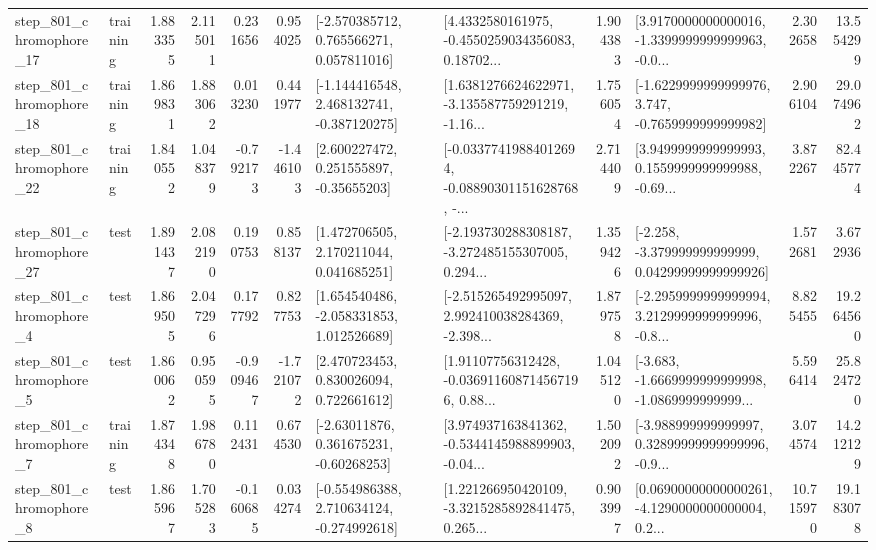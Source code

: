 \begin{tabular}{llrrrrllrlrr}
  step\_801\_chromophore\_17 &  training &      1.883355 &    2.115011 &      0.231656 &  0.954025 &    [-2.570385712, 0.765566271, 0.057811016] &  [4.4332580161975, -0.4550259034356083, 0.18702... &       1.904383 &  [3.9170000000000016, -1.3399999999999963, -0.0... &            2.302658 &         13.554299 \\
  step\_801\_chromophore\_18 &  training &      1.869831 &    1.883062 &      0.013230 &  0.441977 &   [-1.144416548, 2.468132741, -0.387120275] &  [1.6381276624622971, -3.135587759291219, -1.16... &       1.756054 &  [-1.6229999999999976, 3.747, -0.7659999999999982] &            2.906104 &         29.074962 \\
  step\_801\_chromophore\_22 &  training &      1.840552 &    1.048379 &     -0.792173 & -1.446103 &     [2.600227472, 0.251555897, -0.35655203] &  [-0.03377419884012694, -0.08890301151628768, -... &       2.714409 &  [3.9499999999999993, 0.1559999999999988, -0.69... &            3.872267 &         82.445774 \\
  step\_801\_chromophore\_27 &      test &      1.891437 &    2.082190 &      0.190753 &  0.858137 &     [1.472706505, 2.170211044, 0.041685251] &  [-2.193730288308187, -3.272485155307005, 0.294... &       1.359426 &  [-2.258, -3.379999999999999, 0.04299999999999926] &            1.572681 &          3.672936 \\
   step\_801\_chromophore\_4 &      test &      1.869505 &    2.047296 &      0.177792 &  0.827753 &    [1.654540486, -2.058331853, 1.012526689] &  [-2.515265492995097, 2.992410038284369, -2.398... &       1.879758 &  [-2.2959999999999994, 3.2129999999999996, -0.8... &            8.825455 &         19.264560 \\
   step\_801\_chromophore\_5 &      test &      1.860062 &    0.950595 &     -0.909467 & -1.721072 &     [2.470723453, 0.830026094, 0.722661612] &  [1.91107756312428, -0.036911608714567196, 0.88... &       1.045120 &  [-3.683, -1.6669999999999998, -1.0869999999999... &            5.596414 &         25.824720 \\
   step\_801\_chromophore\_7 &  training &      1.874348 &    1.986780 &      0.112431 &  0.674530 &     [-2.63011876, 0.361675231, -0.60268253] &  [3.974937163841362, -0.5344145988899903, -0.04... &       1.502092 &  [-3.988999999999997, 0.32899999999999996, -0.9... &            3.074574 &         14.212129 \\
   step\_801\_chromophore\_8 &      test &      1.865967 &    1.705283 &     -0.160685 &  0.034274 &   [-0.554986388, 2.710634124, -0.274992618] &  [1.221266950420109, -3.3215285892841475, 0.265... &       0.903997 &  [0.06900000000000261, -4.1290000000000004, 0.2... &           10.715970 &         19.183078 \\

\end{tabular}
